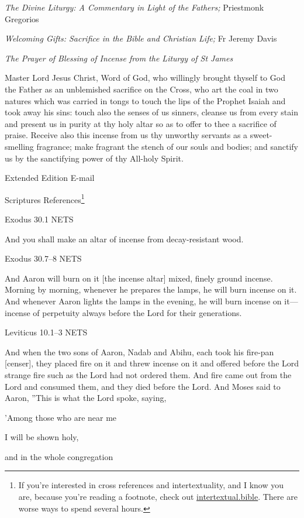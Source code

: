 \documentclass[
]{article}
\newcommand{\RL}[1]{\beginR #1\endR}
\begin{document}
\emph{The Divine Liturgy: A Commentary in Light of the Fathers;}
Priestmonk Gregorios

\emph{Welcoming Gifts: Sacrifice in the Bible and Christian Life;} Fr
Jeremy Davis

\emph{The Prayer of Blessing of Incense from the Liturgy of St James}

Master Lord Jesus Christ, Word of God, who willingly brought thyself to
God the Father as an unblemished sacrifice on the Cross, who art the
coal in two natures which was carried in tongs to touch the lips of the
Prophet Isaiah and took away his sins: touch also the senses of us
sinners, cleanse us from every stain and present us in purity at thy
holy altar so as to offer to thee a sacrifice of praise. Receive also
this incense from us thy unworthy servants as a sweet-smelling
fragrance; make fragrant the stench of our souls and bodies; and
sanctify us by the sanctifying power of thy All-holy Spirit.

Extended Edition E-mail

Scriptures References\footnote{If you're interested in cross references
  and intertextuality, and I know you are, because you're reading a
  footnote, check out
  \href{http://intertextual.bible}{\ul{intertextual.bible}}. There are
  worse ways to spend several hours.}

Exodus 30.1 NETS

And you shall make an altar of incense from decay-resistant wood.

Exodus 30.7--8 NETS

And Aaron will burn on it {[}the incense altar{]} mixed, finely ground
incense. Morning by morning, whenever he prepares the lamps, he will
burn incense on it. And whenever Aaron lights the lamps in the evening,
he will burn incense on it--- incense of perpetuity always before the
Lord for their generations.

Leviticus 10.1--3 NETS

And when the two sons of Aaron, Nadab and Abihu, each took his fire-pan
{[}censer{]}, they placed fire on it and threw incense on it and offered
before the Lord strange fire such as the Lord had not ordered them. And
fire came out from the Lord and consumed them, and they died before the
Lord. And Moses said to Aaron, \RL{''}This is what the Lord spoke,
saying,

\RL{'}Among those who are near me

I will be shown holy,

and in the whole congregation
\end{document}
